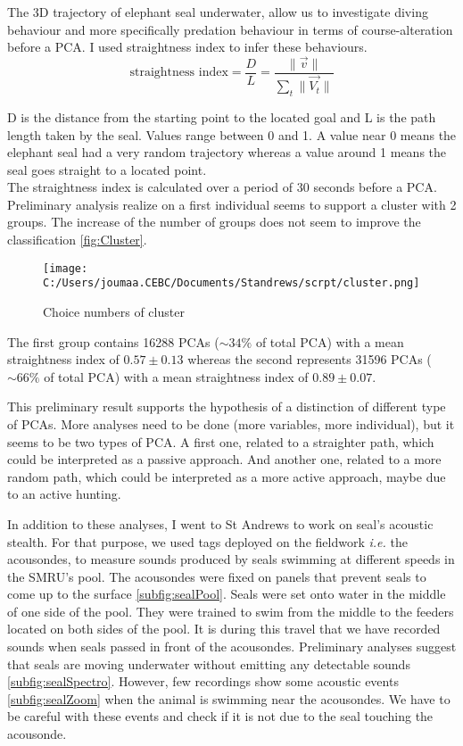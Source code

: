 \documentclass[12pt,a4paper]{report}
\begin{document}
The 3D trajectory of elephant seal underwater, allow us to investigate diving behaviour and more specifically predation behaviour in terms of course-alteration before a PCA. I used straightness index to infer these behaviours.
\begin{equation*}
\text{straightness index} = \frac{D}{L} = \frac{\|\overrightarrow{v}\|}{\sum_{t}{\|\overrightarrow{V_t}\|}}
\end{equation*}

D is the distance from the starting point to the located goal and L is the path length taken by the seal. Values range between 0 and 1. A value near 0 means the elephant seal had a very random trajectory whereas a value around 1 means the seal goes straight to a located point.\\


The straightness index is calculated over a period of 30 seconds before a PCA. Preliminary analysis realize on a first individual seems to support a cluster with 2 groups. The increase of the number of groups does not seem to improve the classification \autoref{fig:Cluster}. 

\begin{figure}[h]
\centering
\texttt{[image: C:/Users/joumaa.CEBC/Documents/Standrews/scrpt/cluster.png]}
\caption{Choice numbers of cluster} 
\label{fig:Cluster} 
\end{figure}

The first group contains 16288 PCAs ($\sim 34\%$ of total PCA) with a mean straightness index of $0.57 \pm 0.13$ whereas the second represents 31596 PCAs ($\sim 66\%$ of total PCA) with a mean straightness index of $0.89 \pm 0.07$. 

This preliminary result supports the hypothesis of a distinction of different type of PCAs. More analyses need to be done (more variables, more individual), but it seems to be two types of PCA. A first one, related to a straighter path, which could be interpreted as a passive approach. And another one, related to a more random path, which could be interpreted as a more active approach, maybe due to an active hunting. 

In addition to these analyses, I went to St Andrews to work on seal’s acoustic stealth. For that purpose, we used tags deployed on the fieldwork \textit{i.e.} the acousondes, to measure sounds produced by seals swimming at different speeds in the SMRU’s pool. The acousondes were fixed on panels that prevent seals to come up to the surface \autoref{subfig:sealPool}. Seals were set onto water in the middle of one side of the pool. They were trained to swim from the middle to the feeders located on both sides of the pool. It is during this travel that we have recorded sounds when seals passed in front of the acousondes.
Preliminary analyses suggest that seals are moving underwater without emitting any detectable sounds \autoref{subfig:sealSpectro}. However, few recordings show some acoustic events \autoref{subfig:sealZoom} when the animal is swimming near the acousondes. We have to be careful with these events and check if it is not due to the seal touching the acousonde. 
\end{document}
